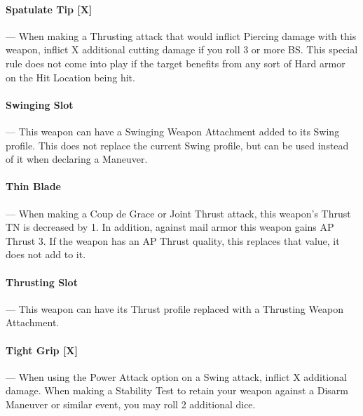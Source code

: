 \documentclass[oneside,11pt,english]{book}
\begin{document}
\vspace{-5pt}\paragraph[Spatulate Tip]{\label{wepqual:Spatulate Tip}Spatulate Tip [X]}---\quad
When making a Thrusting attack that would inflict Piercing damage with this weapon, inflict X additional cutting damage if you roll 3 or more BS. This special rule does not come into play if the target benefits from any sort of Hard armor on the Hit Location being hit.

\vspace{-5pt}\paragraph{\label{wepqual:Swinging Slot}Swinging Slot}---\quad
This weapon can have a Swinging Weapon Attachment added to its Swing profile. This does not replace the current Swing profile, but can be used instead of it when declaring a Maneuver.

\vspace{-5pt}\paragraph{\label{wepqual:Thin Blade}Thin Blade}---\quad
When making a Coup de Grace or Joint Thrust attack, this weapon’s Thrust TN is decreased by 1. In addition, against mail armor this weapon gains AP Thrust 3. If the weapon has an AP Thrust quality, this replaces that value, it does not add to it.

\vspace{-5pt}\paragraph{\label{wepqual:Thrusting Slot}Thrusting Slot}---\quad
This weapon can have its Thrust profile replaced with a Thrusting Weapon Attachment.

\vspace{-5pt}\paragraph[Tight Grip]{\label{wepqual:Tight Grip}Tight Grip [X]}---\quad
When using the Power Attack option on a Swing attack, inflict X additional damage. When making a Stability Test to retain your weapon against a Disarm Maneuver or similar event, you may roll 2 additional dice.
\end{document}
